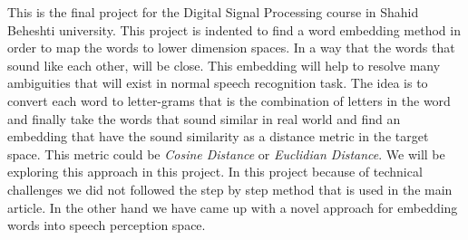 %
This is the final project for the Digital Signal Processing course in Shahid Beheshti university. This project is indented to find a word embedding method in order to map the words to lower dimension spaces. In a way that the words that sound like each other, will be close. This embedding will help to resolve many ambiguities that will exist in normal speech recognition task. 
The idea is to convert each word to letter-grams that is the combination of letters in the word and finally  take the words that sound similar in real world and find an embedding that  have the sound similarity as a distance metric in the target space. This metric could be \textit{Cosine Distance} or \textit{Euclidian Distance}. 
We will be exploring this approach in this project.  In this project because of technical challenges we did not followed the step by step method that is used in the main article. In the other hand we have came up with a novel approach for embedding words into speech perception space. 
 